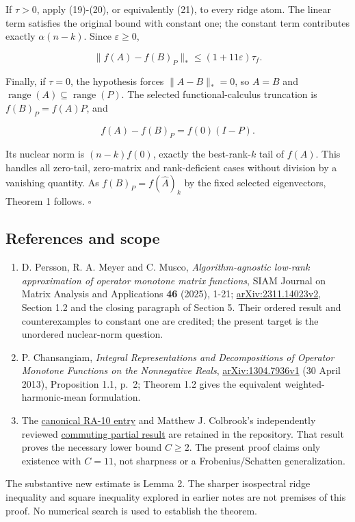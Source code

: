 \documentclass[10pt,a4paper]{article}
\providecommand{\tightlist}{\setlength{\itemsep}{0pt}\setlength{\parskip}{0pt}}
\begin{document}
If \(\tau>0\), apply (19)-(20), or equivalently (21), to every ridge
atom. The linear term satisfies the original bound with constant one;
the constant term contributes exactly \(\alpha(n-k)\). Since
\(\varepsilon\ge0\),

\[
\|f(A)-f(B)_P\|_*\le(1+11\varepsilon)\tau_f.
\]


Finally, if \(\tau=0\), the hypothesis forces \(\|A-B\|_*=0\), so
\(A=B\) and \(\operatorname{range}(A)\subseteq\operatorname{range}(P)\).
The selected functional-calculus truncation is \(f(B)_P=f(A)P\), and

\[
f(A)-f(B)_P=f(0)(I-P).
\]

Its nuclear norm is \((n-k)f(0)\), exactly the best-rank-\(k\) tail of
\(f(A)\). This handles all zero-tail, zero-matrix and rank-deficient
cases without division by a vanishing quantity. As
\(f(B)_P=f(\widehat A)_k\) by the fixed selected eigenvectors, Theorem 1
follows. \(\square\)

\begingroup
\sloppy

\subsection{References and scope}\label{references-and-scope}

\begin{enumerate}
\def\labelenumi{\arabic{enumi}.}
\tightlist
\item
  D. Persson, R. A. Meyer and C. Musco, \emph{Algorithm-agnostic
  low-rank approximation of operator monotone matrix functions}, SIAM
  Journal on Matrix Analysis and Applications \textbf{46} (2025), 1-21;
  \href{https://arxiv.org/html/2311.14023v2}{arXiv:2311.14023v2},
  Section 1.2 and the closing paragraph of Section 5. Their ordered
  result and counterexamples to constant one are credited; the present
  target is the unordered nuclear-norm question.
\item
  P. Chansangiam, \emph{Integral Representations and Decompositions of
  Operator Monotone Functions on the Nonnegative Reals},
  \href{https://arxiv.org/pdf/1304.7936v1}{arXiv:1304.7936v1} (30 April
  2013), Proposition 1.1, p.~2; Theorem 1.2 gives the equivalent
  weighted-harmonic-mean formulation.
\item
  The
  \href{https://github.com/ajt60gaibb/OpenProblemsInNLA/blob/main/randomized-and-low-rank-approximation/RA-10/README.md}{canonical
  RA-10 entry} and Matthew J. Colbrook's independently reviewed
  \href{https://github.com/ajt60gaibb/OpenProblemsInNLA/blob/main/references/colbrook-transfer-2026-09-11/manuscripts/06_commuting_schatten_transfer.pdf}{commuting
  partial result} are retained in the repository. That result proves the
  necessary lower bound \(C\ge2\). The present proof claims only
  existence with \(C=11\), not sharpness or a Frobenius/Schatten
  generalization.
\end{enumerate}

\endgroup

The substantive new estimate is Lemma 2. The sharper isospectral ridge
inequality and square inequality explored in earlier notes are not
premises of this proof. No numerical search is used to establish the
theorem.
\end{document}
